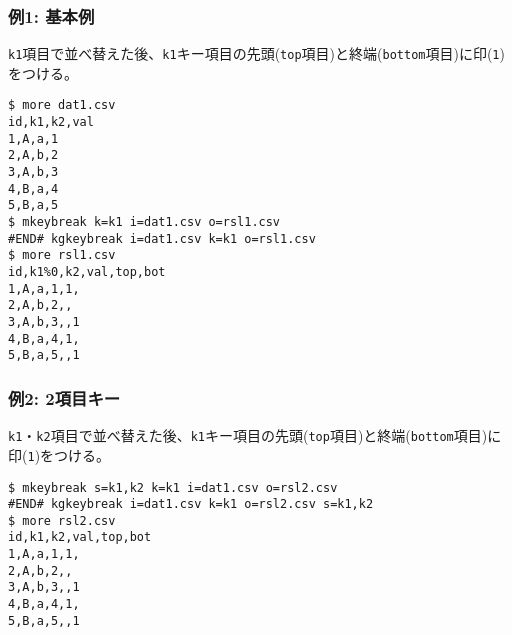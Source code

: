 \subsubsection*{例1: 基本例}

\verb|k1|項目で並べ替えた後、\verb|k1|キー項目の先頭(\verb|top|項目)と終端(\verb|bottom|項目)に印(\verb|1|)をつける。


\begin{Verbatim}[baselinestretch=0.7,frame=single]
$ more dat1.csv
id,k1,k2,val
1,A,a,1
2,A,b,2
3,A,b,3
4,B,a,4
5,B,a,5
$ mkeybreak k=k1 i=dat1.csv o=rsl1.csv
#END# kgkeybreak i=dat1.csv k=k1 o=rsl1.csv
$ more rsl1.csv
id,k1%0,k2,val,top,bot
1,A,a,1,1,
2,A,b,2,,
3,A,b,3,,1
4,B,a,4,1,
5,B,a,5,,1
\end{Verbatim}
\subsubsection*{例2: 2項目キー}

\verb|k1|・\verb|k2|項目で並べ替えた後、\verb|k1|キー項目の先頭(\verb|top|項目)と終端(\verb|bottom|項目)に印(\verb|1|)をつける。


\begin{Verbatim}[baselinestretch=0.7,frame=single]
$ mkeybreak s=k1,k2 k=k1 i=dat1.csv o=rsl2.csv
#END# kgkeybreak i=dat1.csv k=k1 o=rsl2.csv s=k1,k2
$ more rsl2.csv
id,k1,k2,val,top,bot
1,A,a,1,1,
2,A,b,2,,
3,A,b,3,,1
4,B,a,4,1,
5,B,a,5,,1
\end{Verbatim}
